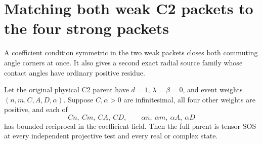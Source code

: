 \section{Matching both weak C2 packets to the four strong packets}
\label{sec:c2-matching-strength}

A coefficient condition symmetric in the two weak packets closes both
commuting angle corners at once.  It also gives a second exact radial
source family whose contact angles have ordinary positive residue.

\begin{theorem}
\label{thm:c2-matching-strength}
Let the original physical C2 parent have $d=1$, $\lambda=\beta=0$,
and event weights $(n,m,C,A,D,\alpha)$.  Suppose $C,\alpha>0$ are
infinitesimal, all four other weights are positive, and each of
\[
 Cn,\ Cm,\ CA,\ CD,\qquad
 \alpha n,\ \alpha m,\ \alpha A,\ \alpha D
\]
has bounded reciprocal in the coefficient field.  Then the full parent
is tensor SOS at every independent projective test and every real or
complex state.
\end{theorem}

